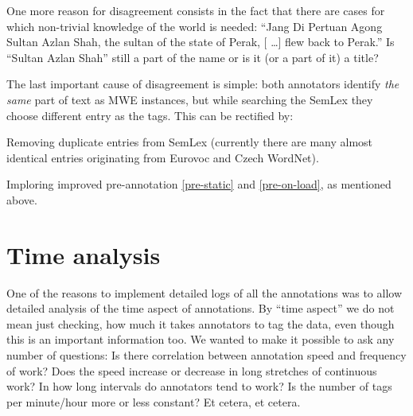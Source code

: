 One more reason for disagreement consists in the fact that there are cases for which non-trivial knowledge of the world is needed: ``Jang Di Pertuan Agong Sultan Azlan Shah, the sultan of the state of Perak, [\kern 2pt \ldots] flew back to Perak.'' Is ``Sultan Azlan Shah'' still a part of the name or is it (or a part of it) a title?

The last important cause of disagreement is simple: both annotators identify \emph{the same} part of text as MWE instances, but while searching the SemLex they choose different entry as the tags. This can be rectified by:
	\begin{compactitem}
		\item Removing duplicate entries from SemLex (currently there are many almost identical entries originating from Eurovoc and Czech WordNet).
		\item Imploring improved pre-annotation \ref{pre-static} and \ref{pre-on-load}, as mentioned above.
	\end{compactitem}



\section{Time analysis}
One of the reasons to implement detailed logs of all the annotations  was to allow detailed analysis of the time aspect of annotations. By ``time aspect'' we do not mean just checking, how much it takes annotators to tag the data, even though this is an important information too. We wanted to make it possible to ask any number of questions: Is there correlation between annotation speed and frequency of work? Does the speed increase or decrease in long stretches of continuous work? In how long intervals do annotators tend to work? Is the number of tags per minute/hour more or less constant? Et cetera, et cetera. 

